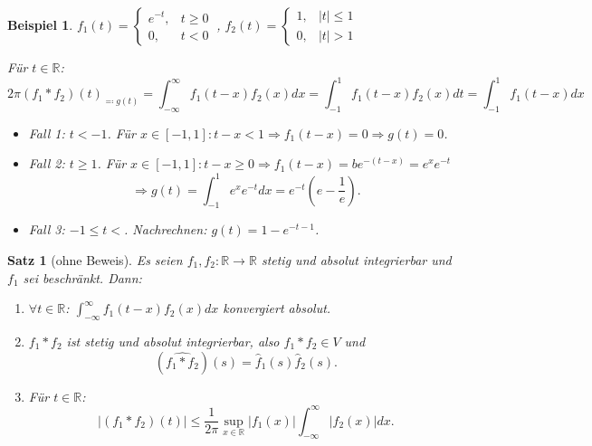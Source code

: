 \documentclass[12pt]{extreport} %
\newcommand{\R}{\mathbb{R}}
\theoremstyle{named}
\theoremstyle{nnamed}
\theoremstyle{itshape}
\newtheorem{satz}[unnamedtheorem]{Satz}
\theoremstyle{normal}
\newtheorem*{beispiel*}{Beispiel}
\begin{document}
\begin{beispiel*}
	$f_1(t) = \begin{cases} e^{-t}, & t \geq 0 \\ 0, & t < 0 \end{cases}~$, $f_2(t) = \begin{cases} 1, & |t| \leq 1 \\ 0, & |t| > 1 \end{cases}$
	
	\bigskip
	
	Für $t \in \R$:
	$$ {2 \pi \left( f_1 \ast f_2 \right) (t)}_{\eqqcolon g(t)} = \int_{-\infty}^{\infty} f_1(t-x) f_2(x) dx = \int_{-1}^{1} f_1(t-x) f_2(x) dt = \int_{-1}^{1} f_1(t-x) dx $$
	\begin{itemize}
		\item Fall 1: $t < -1$. Für $x \in [-1, 1]: t - x < 1 \Rightarrow f_1(t-x) = 0 \Rightarrow g(t) = 0$.
		\item Fall 2: $t \geq 1$. Für $x \in [-1, 1]: t - x \geq 0 \Rightarrow f_1(t-x) =be^{-(t-x)} = e^{x} e^{-t}$
			$$ \Rightarrow g(t) = \int_{-1}^{1} e^{x} e^{-t} dx = e^{-t} \left( e - \frac{1}{e} \right). $$
		\item Fall 3: $-1 \leq t <$. Nachrechnen: $g(t) = 1 - e^{-t-1}$.
	\end{itemize}
\end{beispiel*}


\begin{satz}[ohne Beweis] \label{24.6:satz}
	Es seien $f_1, f_2 \colon \R \rightarrow \R$ stetig und absolut integrierbar und $f_1$ sei beschränkt. Dann:
	\begin{enumerate}
		\item $\forall t \in \R$: $\int_{-\infty}^{\infty} f_1(t-x) f_2(x) dx$ konvergiert absolut.
		\item $f_1 \ast f_2$ ist stetig und absolut integrierbar, also $f_1 \ast f_2 \in V$ und
			$$ \left( \widehat{f_1 \ast f_2} \right) (s) = \hat{f}_1(s) \hat{f}_2(s). $$
		\item Für $t \in \R$: 
			$$ \left| \left( f_1 \ast f_2 \right) (t) \right| \leq \frac{1}{2\pi} \sup_{x \in \R} \left| f_1(x) \right| \int_{-\infty}^{\infty} \left|f_2(x) \right| dx. $$
	\end{enumerate}
\end{satz}
\end{document}
